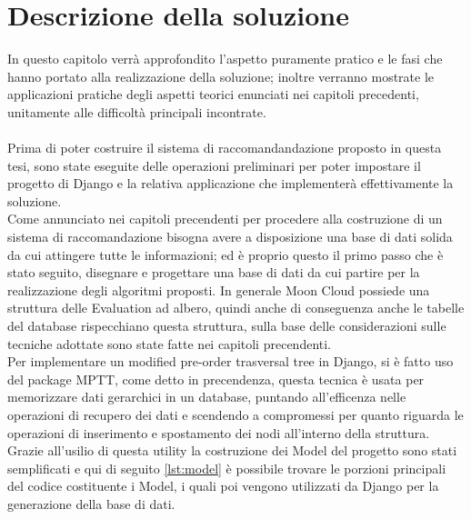 \chapter{Descrizione della soluzione}
\label{chp:04-solution}
In questo capitolo verrà approfondito l'aspetto puramente pratico e le fasi che hanno portato alla realizzazione della soluzione; 
inoltre verranno mostrate le applicazioni pratiche degli aspetti teorici enunciati nei capitoli precedenti, unitamente alle difficoltà 
principali incontrate.\\ \\


Prima di poter costruire il sistema di raccomandandazione proposto in questa tesi, sono state eseguite delle operazioni preliminari
per poter impostare il progetto di Django e la relativa applicazione che implementerà effettivamente la soluzione.\\


Come annunciato nei capitoli precendenti per procedere alla costruzione di un sistema di raccomandazione bisogna avere a disposizione
una base di dati solida da cui attingere tutte le informazioni; ed è proprio questo il primo passo che è stato seguito, disegnare 
e progettare una base di dati da cui partire per la realizzazione degli algoritmi proposti.
In generale Moon Cloud possiede una struttura delle Evaluation ad albero, quindi anche di conseguenza anche le tabelle del database 
rispecchiano questa struttura, sulla base delle considerazioni sulle tecniche adottate sono state fatte nei capitoli precendenti.\\
Per implementare un modified pre-order trasversal tree in Django, si è fatto uso del package MPTT, come detto in precendenza, questa
tecnica è usata per memorizzare dati gerarchici in un database, puntando all'efficenza nelle operazioni di recupero dei dati e 
scendendo a compromessi per quanto riguarda le operazioni di inserimento e spostamento dei nodi all'interno della struttura.
Grazie all'usilio di questa utility la costruzione dei Model del progetto sono stati semplificati e qui di seguito \ref{lst:model}
è possibile trovare le porzioni principali del codice costituente i Model, i quali poi vengono utilizzati da Django per la 
generazione della base di dati. 


